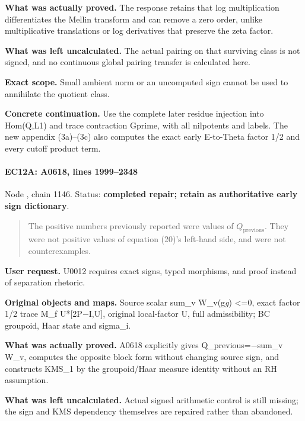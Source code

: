 \textbf{What was actually proved.} The response retains that log
multiplication differentiates the Mellin transform and can remove a zero
order, unlike multiplicative translations or log derivatives that
preserve the zeta factor.

\textbf{What was left uncalculated.} The actual pairing on that
surviving class is not signed, and no continuous global pairing transfer
is calculated here.

\textbf{Exact scope.} Small ambient norm or an uncomputed sign cannot be
used to annihilate the quotient class.

\textbf{Concrete continuation.} Use the complete later residue injection
into Hom(Q,L1) and trace contraction Gprime, with all nilpotents and
labels. The new appendix (3a)--(3c) also computes the exact early
E-to-Theta factor 1/2 and every cutoff product term.

\paragraph{EC12A: A0618, lines
1999--2348}\label{ec12a-a0618-lines-19992348}

Node \protect{}, chain 1146.
Status: \textbf{completed repair; retain as authoritative early sign
dictionary}.

\begin{quote}
The positive numbers previously reported were values of
\(Q_{\mathrm{previous}}\). They were not positive values of equation
(20)'s left-hand side, and were not counterexamples.
\end{quote}

\textbf{User request.} U0012 requires exact signs, typed morphisms, and
proof instead of separation rhetoric.

\textbf{Original objects and maps.} Source scalar sum\_v W\_v(g\emph{g})
\textless=0, exact factor 1/2 trace M\_f
U*[2P\allowbreak{}\ensuremath{−}\allowbreak{}I,U], original local-factor
U, full admissibility; BC groupoid, Haar state and sigma\_i.

\textbf{What was actually proved.} A0618 explicitly gives
Q\_previous=\allowbreak{}\ensuremath{−}\allowbreak{}sum\_v W\_v,
computes the opposite block form without changing source sign, and
constructs KMS\_1 by the groupoid/Haar measure identity without an RH
assumption.

\textbf{What was left uncalculated.} Actual signed arithmetic control is
still missing; the sign and KMS dependency themselves are repaired
rather than abandoned.

